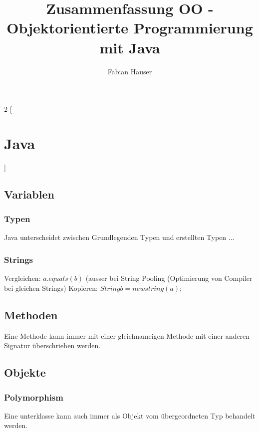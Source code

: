 

\title{Zusammenfassung OO - Objektorientierte Programmierung mit Java}
\author{Fabian Hauser}
 

\maketitle
\begin{multicols}{2}
[
\section{Java}
]

\subsection{Variablen}


\subsubsection{Typen}
	Java unterscheidet zwischen Grundlegenden Typen und erstellten Typen ...

\subsubsection{Strings}
	Vergleichen: $a.equals(b)$ (ausser bei String Pooling (Optimierung von Compiler bei gleichen Strings)
	Kopieren: $String b = new string(a);$

\subsection{Methoden}
	Eine Methode kann immer mit einer gleichnameigen Methode mit einer anderen Signatur überschrieben werden.

\subsection{Objekte}

\subsubsection{Polymorphism}
	Eine unterklasse kann auch immer als Objekt vom übergeordneten Typ behandelt werden.


\end{multicols}
